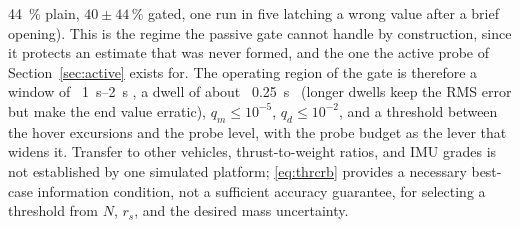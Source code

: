 \documentclass{ieeeaccess}
\begin{document}
{{\SI{44}{\percent} }\hskip0pt%
plain,
$40\pm44$\,\si{\percent} gated, one run in five latching a wrong value after a
brief opening). This is the regime the passive gate cannot handle by
construction, since it protects an estimate that was never formed, and the one
the active probe of Section~\ref{sec:active} exists for. The operating region of
the gate is therefore a window of \mbox{%
\SIrange{1}{2}{\second}}\hskip0pt%
, a dwell of about
\mbox{%
\SI{0.25}{\second} }\hskip0pt%
(longer dwells keep the RMS error but make the end value
erratic), $q_m\le10^{-5}$, $q_d\le10^{-2}$, and a threshold between the hover
excursions and the probe level, with the probe budget as the lever that widens
it. Transfer to other vehicles, thrust-to-weight ratios, and IMU grades is not
established by one simulated platform; \eqref{eq:thrcrb} provides a necessary
best-case information condition, not a sufficient accuracy guarantee, for
selecting a threshold from $N$, $r_s$, and the desired mass uncertainty.
}
\end{document}

